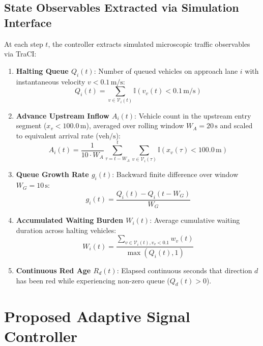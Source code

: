 \documentclass[11pt,journal,onecolumn]{article}
\begin{document}
\subsection{State Observables Extracted via Simulation Interface}
At each step $t$, the controller extracts simulated microscopic traffic observables via TraCI:
\begin{enumerate}
    \item \textbf{Halting Queue $Q_i(t)$}: Number of queued vehicles on approach lane $i$ with instantaneous velocity $v < 0.1\,\text{m/s}$:
    \begin{equation}
        Q_i(t) = \sum_{v \in \mathcal{V}_i(t)} \mathbb{I}(v_v(t) < 0.1\,\text{m/s})
    \end{equation}
    \item \textbf{Advance Upstream Inflow $A_i(t)$}: Vehicle count in the upstream entry segment ($x_v < 100.0\,\text{m}$), averaged over rolling window $W_A = 20\,\text{s}$ and scaled to equivalent arrival rate ($\text{veh/s}$):
    \begin{equation}
        A_i(t) = \frac{1}{10 \cdot W_A} \sum_{\tau=t-W_A}^t \sum_{v \in \mathcal{V}_i(\tau)} \mathbb{I}(x_v(\tau) < 100.0\,\text{m})
    \end{equation}
    \item \textbf{Queue Growth Rate $g_i(t)$}: Backward finite difference over window $W_G = 10\,\text{s}$:
    \begin{equation}
        g_i(t) = \frac{Q_i(t) - Q_i(t - W_G)}{W_G}
    \end{equation}
    \item \textbf{Accumulated Waiting Burden $W_i(t)$}: Average cumulative waiting duration across halting vehicles:
    \begin{equation}
        W_i(t) = \frac{\sum_{v \in \mathcal{V}_i(t), v_v < 0.1} w_v(t)}{\max(Q_i(t), 1)}
    \end{equation}
    \item \textbf{Continuous Red Age $R_d(t)$}: Elapsed continuous seconds that direction $d$ has been red while experiencing non-zero queue ($Q_d(t) > 0$).
\end{enumerate}

\section{Proposed Adaptive Signal Controller}
\end{document}
